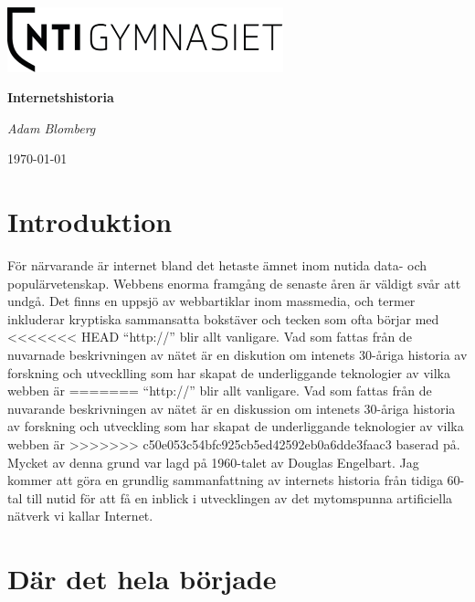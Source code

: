 \documentclass[a4paper,11pt]{article}
\begin{document}
\begin{titlepage}
	\centering
	\includegraphics[width=0.6\textwidth]{Bilder/logo.png}\par\vspace{1cm}
	\vspace{1.5cm}
	{\huge\bfseries Internetshistoria\par}
	\vspace{2cm}
	{\Large\itshape Adam Blomberg\par}
	\vfill
{}
	\vfill

	{\large \today\par}
\end{titlepage}

\tableofcontents
\newpage

\section{Introduktion}
För närvarande är internet bland det hetaste ämnet inom nutida data-
och populärvetenskap. Webbens enorma framgång de senaste åren är väldigt svår
att undgå. Det finns en uppsjö av webbartiklar inom massmedia, och termer
inkluderar kryptiska sammansatta bokstäver och tecken som ofta börjar med
<<<<<<< HEAD
``http://'' blir allt vanligare. Vad som fattas från de nuvarnade beskrivningen
av nätet är en diskution om intenets 30-åriga historia av forskning och
utvecklling som har skapat de underliggande teknologier av vilka webben är
=======
``http://'' blir allt vanligare. Vad som fattas från de nuvarande beskrivningen
av nätet är en diskussion om intenets 30-åriga historia av forskning och
utveckling som har skapat de underliggande teknologier av vilka webben är
>>>>>>> c50e053c54bfc925cb5ed42592eb0a6dde3faac3
baserad på. Mycket av denna grund var lagd på 1960-talet av Douglas Engelbart.
Jag kommer att göra en grundlig sammanfattning av internets historia från tidiga
60-tal till nutid för att få en inblick i utvecklingen av det mytomspunna
artificiella nätverk vi kallar Internet.

\section{Där det hela började}
\end{document}
